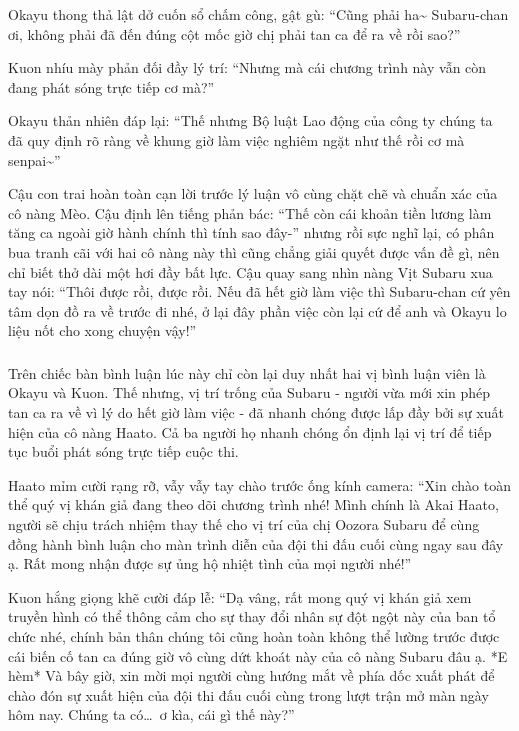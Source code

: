 \documentclass[../main.tex]{subfiles}
\begin{document}
Okayu thong thả lật dở cuốn sổ chấm công, gật gù: ``Cũng phải ha\~{} Subaru-chan ơi, không phải đã đến đúng cột mốc giờ chị phải tan ca để ra về rồi sao?''

Kuon nhíu mày phản đối đầy lý trí: ``Nhưng mà cái chương trình này vẫn còn đang phát sóng trực tiếp cơ mà?''

Okayu thản nhiên đáp lại: ``Thế nhưng Bộ luật Lao động của công ty chúng ta đã quy định rõ ràng về khung giờ làm việc nghiêm ngặt như thế rồi cơ mà senpai\~{}''

Cậu con trai hoàn toàn cạn lời trước lý luận vô cùng chặt chẽ và chuẩn xác của cô nàng Mèo. Cậu định lên tiếng phản bác: ``Thế còn cái khoản tiền lương làm tăng ca ngoài giờ hành chính thì tính sao đây-'' nhưng rồi sực nghĩ lại, có phân bua tranh cãi với hai cô nàng này thì cũng chẳng giải quyết được vấn đề gì, nên chỉ biết thở dài một hơi đầy bất lực. Cậu quay sang nhìn nàng Vịt Subaru xua tay nói: ``Thôi được rồi, được rồi. Nếu đã hết giờ làm việc thì Subaru-chan cứ yên tâm dọn đồ ra về trước đi nhé, ở lại đây phần việc còn lại cứ để anh và Okayu lo liệu nốt cho xong chuyện vậy!''

\subsubsection*{\label{ep-003.III}}

Trên chiếc bàn bình luận lúc này chỉ còn lại duy nhất hai vị bình luận viên là Okayu và Kuon. Thế nhưng, vị trí trống của Subaru - người vừa mới xin phép tan ca ra về vì lý do hết giờ làm việc - đã nhanh chóng được lấp đầy bởi sự xuất hiện của cô nàng Haato. Cả ba người họ nhanh chóng ổn định lại vị trí để tiếp tục buổi phát sóng trực tiếp cuộc thi.


Haato mỉm cười rạng rỡ, vẫy vẫy tay chào trước ống kính camera: ``Xin chào toàn thể quý vị khán giả đang theo dõi chương trình nhé! Mình chính là Akai Haato, người sẽ chịu trách nhiệm thay thế cho vị trí của chị Oozora Subaru để cùng đồng hành bình luận cho màn trình diễn của đội thi đấu cuối cùng ngay sau đây ạ. Rất mong nhận được sự ủng hộ nhiệt tình của mọi người nhé!''

Kuon hắng giọng khẽ cười đáp lễ: ``Dạ vâng, rất mong quý vị khán giả xem truyền hình có thể thông cảm cho sự thay đổi nhân sự đột ngột này của ban tổ chức nhé, chính bản thân chúng tôi cũng hoàn toàn không thể lường trước được cái biến cố tan ca đúng giờ vô cùng dứt khoát này của cô nàng Subaru đâu ạ. *E hèm* Và bây giờ, xin mời mọi người cùng hướng mắt về phía dốc xuất phát để chào đón sự xuất hiện của đội thi đấu cuối cùng trong lượt trận mở màn ngày hôm nay. Chúng ta có\dots\ ơ kìa, cái gì thế này?''
\end{document}
